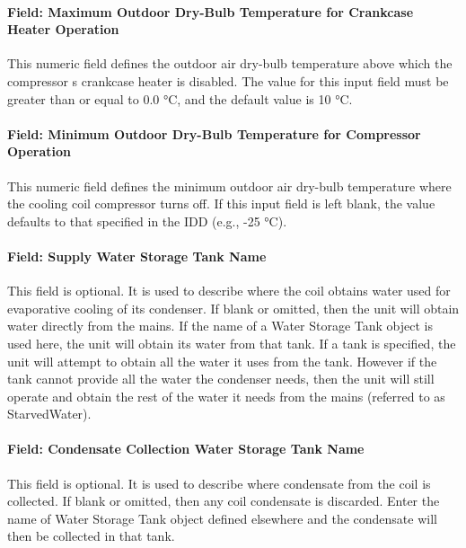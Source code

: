 \paragraph{Field: Maximum Outdoor Dry-Bulb Temperature for Crankcase Heater Operation}\label{field-maximum-outdoor-dry-bulb-temperature-for-crankcase-heater-operation-3}

This numeric field defines the outdoor air dry-bulb temperature above which the compressor s crankcase heater is disabled. The value for this input field must be greater than or equal to 0.0 °C, and the default value is 10 °C.

\paragraph{Field: Minimum Outdoor Dry-Bulb Temperature for Compressor Operation}\label{field-minimum-outdoor-dry-bulb-temperature-for-compressor-operation}

This numeric field defines the minimum outdoor air dry-bulb temperature where the cooling coil compressor turns off. If this input field is left blank, the value defaults to that specified in the IDD (e.g., -25 °C).

\paragraph{Field: Supply Water Storage Tank Name}\label{field-supply-water-storage-tank-name-4-000}

This field is optional. It is used to describe where the coil obtains water used for evaporative cooling of its condenser. If blank or omitted, then the unit will obtain water directly from the mains. If the name of a Water Storage Tank object is used here, the unit will obtain its water from that tank. If a tank is specified, the unit will attempt to obtain all the water it uses from the tank. However if the tank cannot provide all the water the condenser needs, then the unit will still operate and obtain the rest of the water it needs from the mains (referred to as StarvedWater).

\paragraph{Field: Condensate Collection Water Storage Tank Name}\label{field-condensate-collection-water-storage-tank-name-6}

This field is optional. It is used to describe where condensate from the coil is collected. If blank or omitted, then any coil condensate is discarded. Enter the name of Water Storage Tank object defined elsewhere and the condensate will then be collected in that tank.


